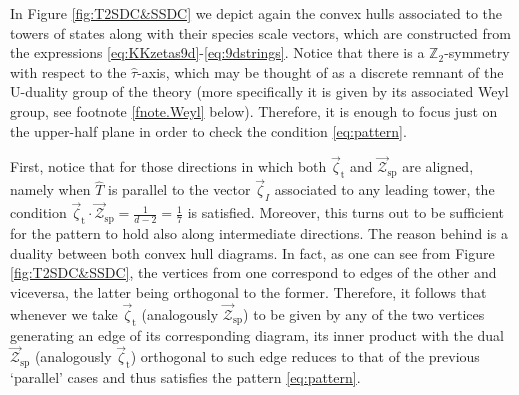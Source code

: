 In Figure \ref{fig:T2SDC&SSDC} we depict again the convex hulls associated to the towers of states along with their species scale vectors, which are constructed from the expressions \eqref{eq:KKzetas9d}-\eqref{eq:9dstrings}. Notice that there is a $\mathbb{Z}_2$-symmetry with respect to the $\hat \tau$-axis, which may be thought of as a discrete remnant of the U-duality group of the theory (more specifically it is given by its associated Weyl group, see footnote \ref{fnote.Weyl} below). Therefore, it is enough to focus just on the upper-half plane in order to check the condition \eqref{eq:pattern}.
	
First, notice that for those directions in which both $\vec{\zeta}_{\text{t}}$ and $\vec{\mathcal{Z}}_{\text{sp}}$ are aligned, namely when $\hat T$ is parallel to the vector $\vec{\zeta}_I$ associated to any leading tower, the condition $\vec{\zeta}_{\text{t}} \cdot \vec{\mathcal{Z}}_{\text{sp}}= \frac{1}{d-2} =\frac{1}{7}$ is satisfied. Moreover, this turns out to be sufficient for the pattern to hold also along intermediate directions. The reason behind is a duality between both convex hull diagrams. In fact, as one can see from Figure \ref{fig:T2SDC&SSDC}, the vertices from one correspond to edges of the other and viceversa, the latter being orthogonal to the former. Therefore, it follows that whenever we take $\vec{\zeta}_{\text{t}}$ (analogously $\vec{\mathcal{Z}}_{\text{sp}}$) to be given by any of the two vertices generating an edge of its corresponding diagram, its inner product with the dual $\vec{\mathcal{Z}}_{\text{sp}}$ (analogously $\vec{\zeta}_{\text{t}}$) orthogonal to such edge reduces to that of the previous `parallel' cases and thus satisfies the pattern \eqref{eq:pattern}.
	
